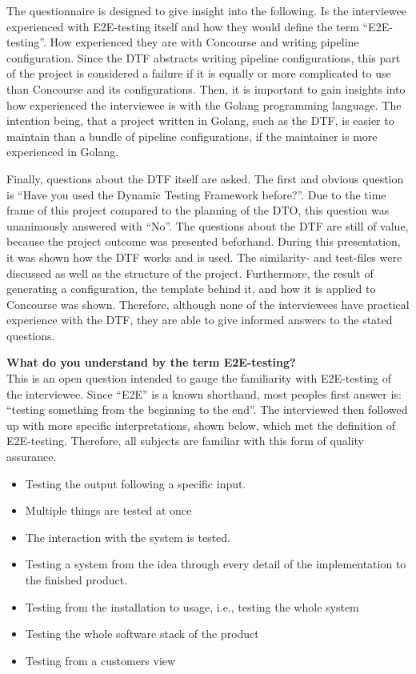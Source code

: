 The questionnaire is designed to give insight into the following.
Is the interviewee experienced with E2E-testing itself and how they would define the term ``E2E-testing''.
How experienced they are with Concourse and writing pipeline configuration.
Since the DTF abstracts writing pipeline configurations, this part of the project is considered a failure if it is equally or more complicated to use than Concourse and its configurations.
Then, it is important to gain insights into how experienced the interviewee is with the Golang programming language.
The intention being, that a project written in Golang, such as the DTF, is easier to maintain than a bundle of pipeline configurations, if the maintainer is more experienced in Golang.

Finally, questions about the DTF itself are asked.
The first and obvious question is ``Have you used the Dynamic Testing Framework before?''.
Due to the time frame of this project compared to the planning of the DTO, this question was unanimously answered with ``No''.
The questions about the DTF are still of value, because the project outcome was presented beforhand.
During this presentation, it was shown how the DTF works and is used.
The similarity- and test-files were discussed as well as the structure of the project.
Furthermore, the result of generating a configuration, the template behind it, and how it is applied to Concourse was shown.
Therefore, although none of the interviewees have practical experience with the DTF, they are able to give informed answers to the stated questions.

\textbf{What do you understand by the term E2E-testing?}\\
This is an open question intended to gauge the familiarity with E2E-testing of the interviewee.
Since ``E2E'' is a known shorthand, most peoples first answer is: ``testing something from the beginning to the end''.
The interviewed then followed up with more specific interpretations, shown below, which met the definition of E2E-testing.
Therefore, all subjects are familiar with this form of quality assurance.

\begin{itemize}
    \item Testing the output following a specific input.
    \item Multiple things are tested at once
    \item The interaction with the system is tested.
    \item Testing a system from the idea through every detail of the implementation to the finished product.
    \item Testing from the installation to usage, i.e., testing the whole system
    \item Testing the whole software stack of the product
    \item Testing from a customers view
\end{itemize}


